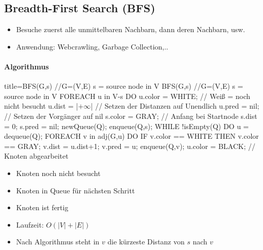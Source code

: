 \documentclass[
    ngerman,
    color=3b,
    dark_mode,
    load_common, %
    summary,
    boxarc,
]{tuda_summary}
\begin{document}
\subsection{Breadth-First Search (BFS)}
\begin{idea}\mbox{}
    \begin{itemize}
        \item Besuche zuerst alle unmittelbaren Nachbarn, dann deren Nachbarn, usw.
        \item Anwendung: Webcrawling, Garbage Collection,..
    \end{itemize}
\end{idea}

\paragraph{Algorithmus}\mbox{}
\begin{codeBlock}[autogobble,escapeinside=||]{title={BFS(G,s) //G=(V,E) s = source node in V}}
    BFS(G,s) //G=(V,E) s = source node in V
    FOREACH u in V-{s} DO
        u.color = WHITE;        // Wei\ss{} = noch nicht besucht
        u.dist = |$+\infty$|            // Setzen der Distanzen auf Unendlich
        u.pred = nil;           // Setzen der Vorgänger auf nil
    s.color = GRAY;             // Anfang bei Startnode
    s.dist = 0;
    s.pred = nil;
    newQueue(Q);
    enqueue(Q,s);
    WHILE !isEmpty(Q) DO
        u = dequeue(Q); 
        FOREACH v in adj(G,u) DO
            IF v.color == WHITE THEN
                v.color == GRAY;
                v.dist = u.dist+1;
                v.pred = u;
                enqueue(Q,v);
        u.color = BLACK;            // Knoten abgearbeitet
\end{codeBlock}
\begin{tcolorbox}[
        colback=yellow!20,
        colframe=black!50!red!100,
        enhanced,
        title={Farben:}
    ]
    \begin{itemize}
        \item { Knoten noch nicht besucht}
        \item { Knoten in Queue für nächsten Schritt}
        \item { Knoten ist fertig}
    \end{itemize}
\end{tcolorbox}
\begin{itemize}
    \item Laufzeit: $O(|V| + |E|)$
    \item Nach Algorithmus steht in $v$ die kürzeste Distanz von $s$ nach $v$
\end{itemize}
\end{document}
